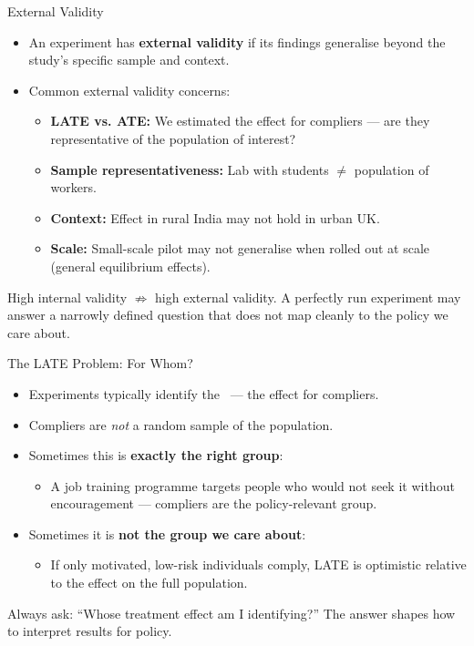 \documentclass[aspectratio=169, 11pt]{beamer}
\begin{document}
\begin{frame}[t]{External Validity}
\begin{itemize}
  \setlength\itemsep{0.5em}
  \item An experiment has \textbf{external validity} if its findings generalise
        beyond the study's specific sample and context.
  \item Common external validity concerns:
    \begin{itemize}
      \item \textbf{LATE vs. ATE:} We estimated the effect for compliers —
            are they representative of the population of interest?
      \item \textbf{Sample representativeness:} Lab with students
            $\neq$ population of workers.
      \item \textbf{Context:} Effect in rural India may not hold in urban UK.
      \item \textbf{Scale:} Small-scale pilot may not generalise when rolled out
            at scale (general equilibrium effects).
    \end{itemize}
\end{itemize}
\vspace{0.3em}
\begin{warningbox}
High internal validity $\not\Rightarrow$ high external validity.
A perfectly run experiment may answer a narrowly defined question
that does not map cleanly to the policy we care about.
\end{warningbox}
\end{frame}

\begin{frame}[t]{The LATE Problem: For Whom?}
\begin{itemize}
  \setlength\itemsep{0.5em}
  \item Experiments typically identify the \LATE\ — the effect for compliers.
  \item Compliers are \emph{not} a random sample of the population.
  \item Sometimes this is \textbf{exactly the right group}:
    \begin{itemize}
      \item A job training programme targets people who would not seek it
            without encouragement — compliers are the policy-relevant group.
    \end{itemize}
  \item Sometimes it is \textbf{not the group we care about}:
    \begin{itemize}
      \item If only motivated, low-risk individuals comply, LATE is optimistic
            relative to the effect on the full population.
    \end{itemize}
\end{itemize}
\vspace{0.3em}
\begin{intuitionbox}
Always ask: ``Whose treatment effect am I identifying?''
The answer shapes how to interpret results for policy.
\end{intuitionbox}
\end{frame}
\end{document}
